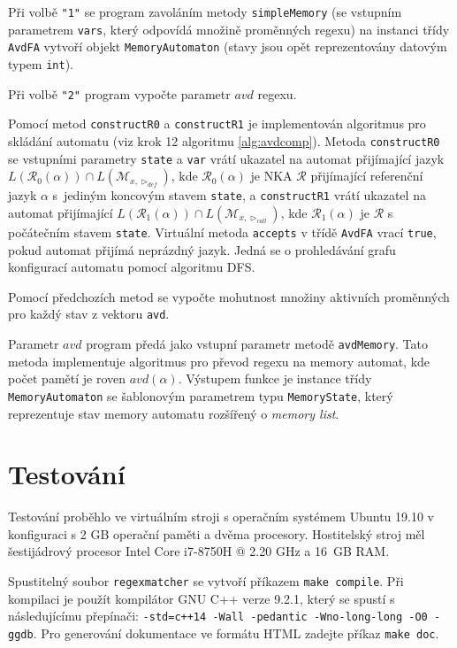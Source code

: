 \documentclass[thesis=B,czech]{FITthesis}[2019/12/23]
\theoremstyle{definition}
\begin{document}
Při volbě \texttt{"1"} se program zavoláním metody \texttt{simpleMemory} (se vstupním parametrem \texttt{vars}, který odpovídá množině proměnných regexu) na instanci třídy \texttt{AvdFA} vytvoří objekt \texttt{MemoryAutomaton} (stavy jsou opět reprezentovány datovým typem \texttt{int}).

Při volbě \texttt{"2"} program vypočte parametr $avd$ regexu.

Pomocí metod \texttt{constructR0} a \texttt{constructR1} je implementován algoritmus pro skládání automatu (viz krok 12 algoritmu \ref{alg:avdcomp}). Metoda \texttt{constructR0} se vstupními parametry \texttt{state} a \texttt{var} vrátí ukazatel na automat přijímající jazyk $L(\mathcal{R}_0(\alpha))\cap L(\mathcal{M}_{x, \triangleright_{def}})$, kde $\mathcal{R}_0(\alpha)$ je NKA $\mathcal{R}$ přijímající referenční jazyk $\alpha$ s~jediným koncovým stavem \texttt{state}, a \texttt{constructR1} vrátí ukazatel na automat přijímající $L(\mathcal{R}_1(\alpha))\cap L(\mathcal{M}_{x, \triangleright_{call}})$, kde $\mathcal{R}_1(\alpha)$ je $\mathcal{R}$ s počátečním stavem \texttt{state}. Virtuální metoda \texttt{accepts} v třídě \texttt{AvdFA} vrací \texttt{true}, pokud automat přijímá neprázdný jazyk. Jedná se o prohledávání grafu konfigurací automatu pomocí algoritmu DFS.

Pomocí předchozích metod se vypočte mohutnost množiny aktivních proměnných pro každý stav z vektoru \texttt{avd}. 

Parametr $avd$ program předá jako vstupní parametr metodě \texttt{avdMemory}. Tato metoda implementuje algoritmus pro převod regexu na memory automat, kde počet pamětí je roven  $avd(\alpha)$. Výstupem funkce je instance třídy \texttt{MemoryAutomaton} se šablonovým parametrem typu \texttt{MemoryState}, který reprezentuje stav memory automatu rozšířený o \emph{memory list}.

\chapter{Testování}

Testování proběhlo ve virtuálním stroji s operačním systémem Ubuntu 19.10 v konfiguraci s 2 GB operační paměti a dvěma procesory. 
Hostitelský stroj měl šestijádrový procesor Intel Core i7-8750H @ 2.20 GHz a 16~GB RAM.

Spustitelný soubor \texttt{regexmatcher} se vytvoří příkazem \texttt{make compile}. Při kompilaci je použít kompilátor GNU C++ verze 9.2.1, který se spustí s následujícímu přepínači: \texttt{-std=c++14 -Wall -pedantic -Wno-long-long -O0 -ggdb}. Pro generování dokumentace ve formátu HTML zadejte příkaz \texttt{make doc}.
\end{document}
